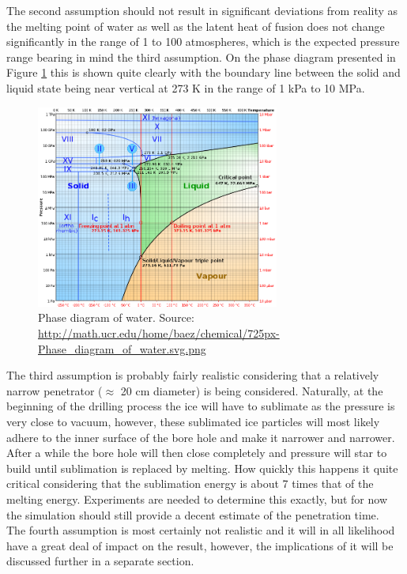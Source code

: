 \noindent
The second assumption should not result in significant deviations from reality as the melting point of water as well as the latent heat of fusion does not change significantly in the range of 1 to 100 atmospheres, which is the expected pressure range bearing in mind the third assumption. On the phase diagram presented in Figure \ref{fig:waterPhase} this is shown quite clearly with the boundary line between the solid and liquid state being near vertical at 273 K in the range of 1 kPa to 10 MPa.\\

\begin{figure}[ht]
	\centering
	\includegraphics[width=8cm]{figures/LAMC/waterPhase}
	\caption{Phase diagram of water. Source: \url{http://math.ucr.edu/home/baez/chemical/725px-Phase_diagram_of_water.svg.png}}
	\label{fig:waterPhase}
\end{figure}

\noindent
The third assumption is probably fairly realistic considering that a relatively narrow penetrator ($\approx$ 20 cm diameter) is being considered. Naturally, at the beginning of the drilling process the ice will have to sublimate as the pressure is very close to vacuum, however, these sublimated ice particles will most likely adhere to the inner surface of the bore hole and make it narrower and narrower. After a while the bore hole will then close completely and pressure will star to build until sublimation is replaced by melting. How quickly this happens it quite critical considering that the sublimation energy is about 7 times\cite{website:engineeringToolbox} that of the melting energy. Experiments are needed to determine this exactly, but for now the simulation should still provide a decent estimate of the penetration time.\\

\noindent
The fourth assumption is most certainly not realistic and it will in all likelihood have a great deal of impact on the result, however, the implications of it will be discussed further in a separate section.

